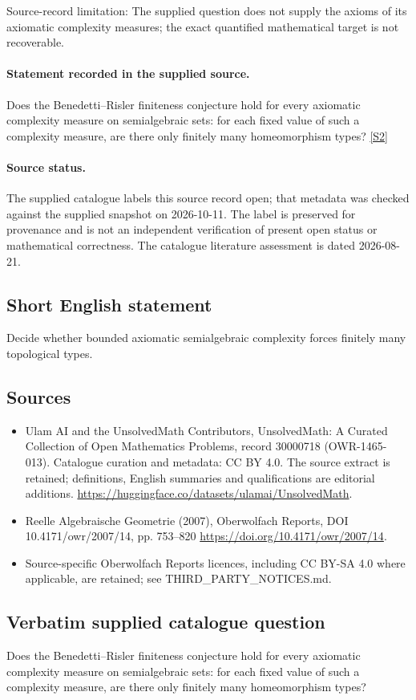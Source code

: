 \documentclass[11pt]{article}
\begin{document}
Source-record limitation: The supplied question does not supply the axioms of its axiomatic complexity measures; the exact quantified mathematical target is not recoverable.
\paragraph{Statement recorded in the supplied source.}
Does the Benedetti–Risler finiteness conjecture hold for every axiomatic complexity measure on semialgebraic sets: for each fixed value of such a complexity measure, are there only finitely many homeomorphism types? \href{https://doi.org/10.4171/owr/2007/14}{[S2]}
\paragraph{Source status.}
The supplied catalogue labels this source record open; that metadata was checked against the supplied snapshot on 2026-10-11. The label is preserved for provenance and is not an independent verification of present open status or mathematical correctness. The catalogue literature assessment is dated 2026-08-21.
\subsection{Short English statement}
Decide whether bounded axiomatic semialgebraic complexity forces finitely many topological types.
\subsection{Sources}
\begin{itemize}
\item[S1] Ulam AI and the UnsolvedMath Contributors, UnsolvedMath: A Curated Collection of Open Mathematics Problems, record 30000718 (OWR-1465-013). Catalogue curation and metadata: CC BY 4.0. The source extract is retained; definitions, English summaries and qualifications are editorial additions.
\url{https://huggingface.co/datasets/ulamai/UnsolvedMath}.
\item[S2] Reelle Algebraische Geometrie (2007), Oberwolfach Reports, DOI 10.4171/owr/2007/14, pp. 753--820
\url{https://doi.org/10.4171/owr/2007/14}.
\item Source-specific Oberwolfach Reports licences, including CC BY-SA 4.0 where applicable, are retained; see THIRD\_PARTY\_NOTICES.md.
\end{itemize}
\subsection{Verbatim supplied catalogue question}
Does the Benedetti–Risler finiteness conjecture hold for every axiomatic complexity measure on semialgebraic sets: for each fixed value of such a complexity measure, are there only finitely many homeomorphism types?
\end{document}
